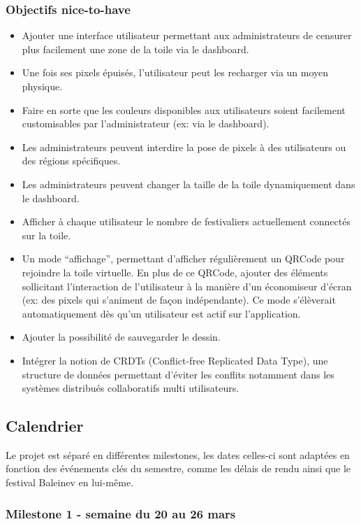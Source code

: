 \subsubsection{Objectifs \guillemotleft nice-to-have\guillemotright}

\begin{itemize}
  \item Ajouter une interface utilisateur permettant aux administrateurs de censurer plus facilement une zone de la toile via le dashboard.
  \item Une fois ses pixels épuisés, l'utilisateur peut les recharger via un moyen physique.
  \item Faire en sorte que les couleurs disponibles aux utilisateurs soient facilement customisables par l'administrateur (ex: via le dashboard).
  \item Les administrateurs peuvent interdire la pose de pixels à des utilisateurs ou des régions spécifiques.
  \item Les administrateurs peuvent changer la taille de la toile dynamiquement dans le dashboard.
  \item Afficher à chaque utilisateur le nombre de festivaliers actuellement connectés sur la toile.
  \item Un mode “affichage”, permettant d'afficher régulièrement un QRCode pour rejoindre la toile virtuelle. En plus de ce QRCode, ajouter des éléments sollicitant l'interaction de l'utilisateur à la manière d'un économiseur d'écran (ex: des pixels qui s'animent de façon indépendante). Ce mode s'élèverait automatiquement dès qu'un utilisateur est actif sur l'application.
  \item Ajouter la possibilité de sauvegarder le dessin.
  \item Intégrer la notion de CRDTs (Conflict-free Replicated Data Type), une structure de données permettant d'éviter les conflits notamment dans les systèmes distribués collaboratifs multi utilisateurs.
\end{itemize}

\subsection{Calendrier}

Le projet est séparé en différentes milestones, les dates celles-ci sont adaptées en fonction des événements clés du semestre, comme les délais de rendu ainsi que le festival Baleinev en lui-même.

\subsubsection{Milestone 1 - semaine du 20 au 26 mars}

